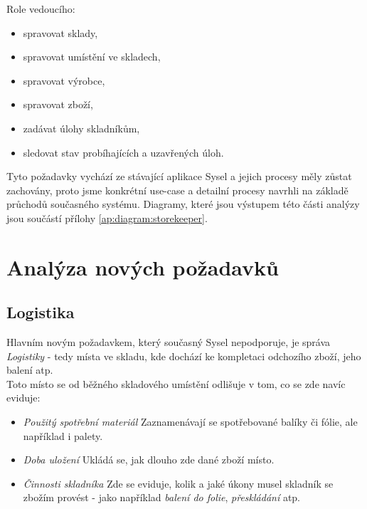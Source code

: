 Role vedoucího:
\begin{itemize}
	\item spravovat sklady,
	\item spravovat umístění ve skladech,
	\item spravovat výrobce,
	\item spravovat zboží,
	\item zadávat úlohy skladníkům,
	\item sledovat stav probíhajících a uzavřených úloh.
\end{itemize}

Tyto požadavky vychází ze stávající aplikace Sysel a jejich procesy měly zůstat zachovány, proto jsme konkrétní use-case a detailní procesy navrhli na základě průchodů současného systému. Diagramy, které jsou výstupem této části analýzy jsou součástí přílohy \ref{ap:diagram:storekeeper}.


\section{Analýza nových požadavků}

\subsection{Logistika}

Hlavním novým požadavkem, který současný Sysel nepodporuje, je správa \emph{Logistiky} - tedy místa ve skladu, kde dochází ke kompletaci odchozího zboží, jeho balení atp.\\
Toto místo se od běžného skladového umístění odlišuje v tom, co se zde navíc eviduje:
\begin{itemize}
	\item \emph{Použitý spotřební materiál} Zaznamenávají se spotřebované balíky či fólie, ale například i palety.
	\item \emph{Doba uložení} Ukládá se, jak dlouho zde dané zboží  místo.
	\item \emph{Činnosti skladníka} Zde se eviduje, kolik a jaké úkony musel skladník se zbožím provést - jako například \emph{balení do folie}, \emph{přeskládání} atp.
\end{itemize}

